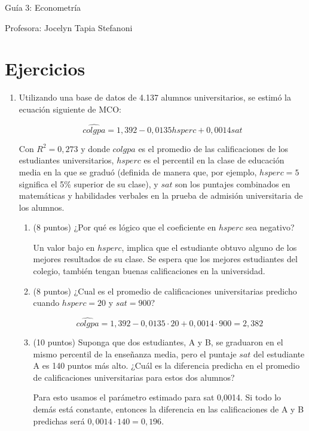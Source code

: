 \documentclass[10pt,a4paper]{article}
\begin{document}
\vspace{5cm}

\begin{center}
    {\Large  Guía 3: Econometría }

Profesora:    Jocelyn Tapia Stefanoni
\end{center}



\section{Ejercicios}
\begin{enumerate}
    \item Utilizando una base de datos de 4.137 alumnos universitarios, se estimó la ecuación siguiente de MCO:

    
$$\hat{colgpa} =1,392 -0,0135 hsperc + 0,0014 sat$$

Con $R^2=0,273$ y donde $colgpa$ es el promedio de las calificaciones de los estudiantes universitarios,
$hsperc$ es el percentil en la clase de educación media en la que se graduó (definida de manera que, por
ejemplo, $hsperc= 5$ significa el 5\% superior de su clase), y $sat$ son los puntajes combinados en
matemáticas y habilidades verbales en la prueba de admisión universitaria de los alumnos.
\begin{enumerate} 
\item (8 puntos) ¿Por qué es lógico que el coeficiente en $hsperc$ sea negativo?

{\color{blue} Un valor  bajo en $hsperc$, implica que el estudiante obtuvo alguno de los mejores resultados de su clase. Se espera que los mejores estudiantes del colegio, también tengan buenas calificaciones en la universidad.  }
\item  (8 puntos) ¿Cual es el promedio de calificaciones universitarias predicho cuando $hsperc= 20$ y $sat=900$?

{\color{blue} $$\hat{colgpa} =1,392 -0,0135 \cdot 20 + 0,0014 \cdot 900=2,382$$}


\item (10 puntos) Suponga que dos estudiantes, A y B, se graduaron en el mismo percentil de la enseñanza media, pero el puntaje $sat$ del estudiante A es 140 puntos más alto. ¿Cuál es la diferencia predicha en el promedio
de calificaciones universitarias para estos dos alumnos? 

{\color{blue} Para esto usamos el parámetro estimado para sat 0,0014. Si todo lo demás está constante, entonces la diferencia en las calificaciones de A y B predichas será $0,0014\cdot 140=0,196$.}


\end{enumerate}
\end{enumerate}
\end{document}

